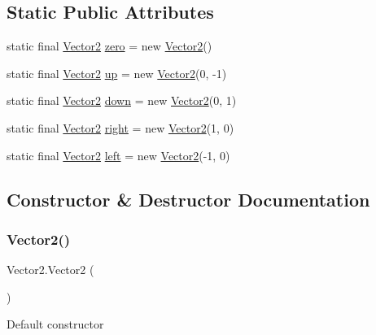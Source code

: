 \subsection*{Static Public Attributes}
\begin{DoxyCompactItemize}
\item 
static final \mbox{\hyperlink{class_vector2}{Vector2}} \mbox{\hyperlink{class_vector2_a0eb5cdb3286a9ed344e9f193a67662c1}{zero}} = new \mbox{\hyperlink{class_vector2}{Vector2}}()
\item 
static final \mbox{\hyperlink{class_vector2}{Vector2}} \mbox{\hyperlink{class_vector2_a46039dbadb78f36a65d9097d79f17e0f}{up}} = new \mbox{\hyperlink{class_vector2}{Vector2}}(0, -\/1)
\item 
static final \mbox{\hyperlink{class_vector2}{Vector2}} \mbox{\hyperlink{class_vector2_a46688c121909b9272b28515914262cae}{down}} = new \mbox{\hyperlink{class_vector2}{Vector2}}(0, 1)
\item 
static final \mbox{\hyperlink{class_vector2}{Vector2}} \mbox{\hyperlink{class_vector2_a3e64ea2bc84a81a281a9d938a459bfc8}{right}} = new \mbox{\hyperlink{class_vector2}{Vector2}}(1, 0)
\item 
static final \mbox{\hyperlink{class_vector2}{Vector2}} \mbox{\hyperlink{class_vector2_a11bfafbd9c5cdba775129514ea177e85}{left}} = new \mbox{\hyperlink{class_vector2}{Vector2}}(-\/1, 0)
\end{DoxyCompactItemize}


\subsection{Constructor \& Destructor Documentation}
\mbox{\label{class_vector2_ad254b1c618b84ebd5bdc05eefb831647}} 
\subsubsection{\texorpdfstring{Vector2()}{Vector2()}\hspace{0.1cm}{\footnotesize\ttfamily [1/2]}}
{\footnotesize\ttfamily Vector2.\+Vector2 (\begin{DoxyParamCaption}{ }\end{DoxyParamCaption})\hspace{0.3cm}{\ttfamily [inline]}}

Default constructor \mbox{\label{class_vector2_a206a86898973ddf9391e04b4b3287508}} 
